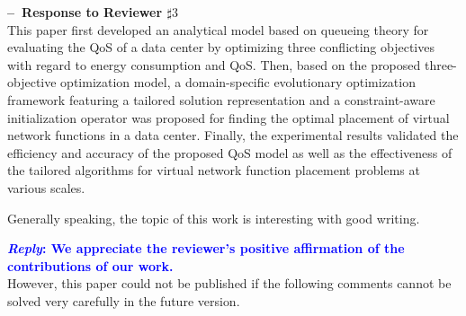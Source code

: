 
\noindent\textbf{--\ Response to Reviewer $\sharp3$}\\

\textsf{This paper first developed an analytical model based on queueing theory for evaluating the QoS of a data center by optimizing three conflicting objectives with regard to energy consumption and QoS. Then, based on the proposed three-objective optimization model, a domain-specific evolutionary optimization framework featuring a tailored solution representation and a constraint-aware initialization operator was proposed for finding the optimal placement of virtual network functions in a data center. Finally, the experimental results validated the efficiency and accuracy of the proposed QoS model as well as the effectiveness of the tailored algorithms for virtual network function placement problems at various scales.}

\textsf{Generally speaking, the topic of this work is interesting with good writing.}

\textcolor{blue}{\textbf{\textit{Reply}: We appreciate the reviewer’s positive affirmation of the contributions of our work.}}\\

\noindent\textsf{However, this paper could not be published if the following comments cannot be solved very carefully in the future version.}

